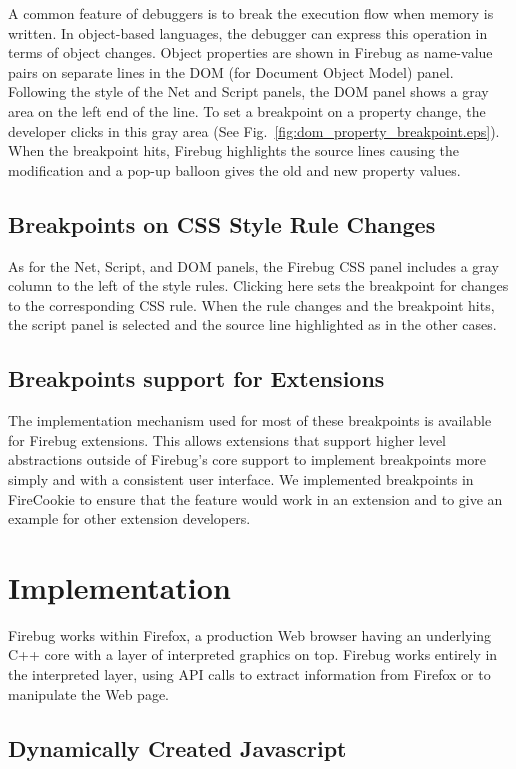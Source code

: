 \documentclass{www2010-accepted}
\begin{document}
A common feature of debuggers is to break the execution flow when
memory is written. In object-based languages, the debugger can express
this operation in terms of object changes.  Object properties are
shown in Firebug as name-value pairs on separate lines in the DOM (for
Document Object Model) panel. Following the style of the Net and
Script panels, the DOM panel shows a gray area on the left end of the
line. To set a breakpoint on a property change, the developer clicks
in this gray area (See
Fig.~\ref{fig:dom_property_breakpoint.eps}). When the breakpoint hits,
Firebug highlights the source lines causing the modification and
a pop-up balloon gives the old and new property values.

\subsection{Breakpoints on CSS Style Rule Changes}

As for the Net, Script, and DOM panels, the Firebug CSS panel includes a gray column to the
left of the style rules. Clicking here sets the breakpoint for changes to the corresponding
CSS rule. When the rule changes and the breakpoint hits, the script panel is selected and
the source line highlighted as in the other cases.

\subsection{Breakpoints support for Extensions}
The implementation mechanism used for most of these breakpoints is available for Firebug extensions.
This allows extensions that support higher level abstractions outside of Firebug's
core support to implement breakpoints more simply and with a consistent user interface. We
implemented breakpoints in FireCookie\cite{FireCookie2009} to ensure that the feature would work
in an extension and to give an example for other extension developers.


\section{Implementation}

Firebug works within Firefox, a production Web browser having an
underlying C++ core with a layer of interpreted graphics on
top. Firebug works entirely in the interpreted layer, using API calls
to extract information from Firefox or to manipulate the Web page.

\subsection{Dynamically Created Javascript}
\end{document}
